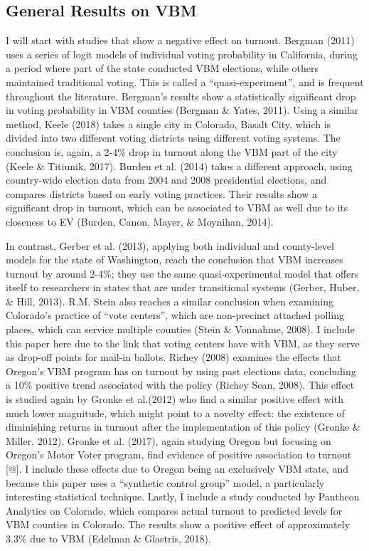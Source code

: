 \documentclass[12pt,twoside]{reedthesis}
\begin{document}
  \subsection{General Results on VBM}\label{general-results-on-vbm}
  
  I will start with studies that show a negative effect on turnout.
  Bergman (2011) uses a series of logit models of individual voting
  probability in California, during a period where part of the state
  conducted VBM elections, while others maintained traditional voting.
  This is called a ``quasi-experiment'', and is frequent throughout the
  literature. Bergman's results show a statistically significant drop in
  voting probability in VBM counties (Bergman \& Yates, 2011). Using a
  similar method, Keele (2018) takes a single city in Colorado, Basalt
  City, which is divided into two different voting districts using
  different voting systems. The conclusion is, again, a 2-4\% drop in
  turnout along the VBM part of the city (Keele \& Titiunik, 2017). Burden
  et al. (2014) takes a different approach, using country-wide election
  data from 2004 and 2008 presidential elections, and compares districts
  based on early voting practices. Their results show a significant drop
  in turnout, which can be associated to VBM as well due to its closeness
  to EV (Burden, Canon, Mayer, \& Moynihan, 2014).
  
  In contrast, Gerber et al. (2013), applying both individual and
  county-level models for the state of Washington, reach the conclusion
  that VBM increases turnout by around 2-4\%; they use the same
  quasi-experimental model that offers itself to researchers in states
  that are under transitional systems (Gerber, Huber, \& Hill, 2013). R.M.
  Stein also reaches a similar conclusion when examining Colorado's
  practice of ``vote centers'', which are non-precinct attached polling
  places, which can service multiple counties (Stein \& Vonnahme, 2008). I
  include this paper here due to the link that voting centers have with
  VBM, as they serve as drop-off points for mail-in ballots. Richey (2008)
  examines the effects that Oregon's VBM program has on turnout by using
  past elections data, concluding a 10\% positive trend associated with
  the policy (Richey Sean, 2008). This effect is studied again by Gronke
  et al.(2012) who find a similar positive effect with much lower
  magnitude, which might point to a novelty effect: the existence of
  diminishing returns in turnout after the implementation of this policy
  (Gronke \& Miller, 2012). Gronke et al. (2017), again studying Oregon
  but focusing on Oregon's Motor Voter program, find evidence of positive
  association to turnout {[}@{]}. I include these effects due to Oregon
  being an exclusively VBM state, and because this paper uses a
  ``synthetic control group'' model, a particularly interesting
  statistical technique. Lastly, I include a study conducted by Pantheon
  Analytics on Colorado, which compares actual turnout to predicted levels
  for VBM counties in Colorado. The results show a positive effect of
  approximately 3.3\% due to VBM (Edelman \& Glastris, 2018).
  
\end{document}
